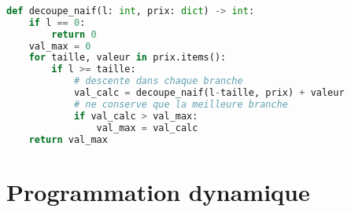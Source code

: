 \documentclass[svgnames,11pt]{beamer}
\begin{document}
\begin{frame}[fragile]
    \frametitle{}

\begin{center}
\begin{lstlisting}[language=Python , basicstyle=\ttfamily\small, xleftmargin=0.2em, xrightmargin=0em]
def decoupe_naif(l: int, prix: dict) -> int:
    if l == 0:
        return 0
    val_max = 0
    for taille, valeur in prix.items():
        if l >= taille:
            # descente dans chaque branche
            val_calc = decoupe_naif(l-taille, prix) + valeur
            # ne conserve que la meilleure branche
            if val_calc > val_max:
                val_max = val_calc
    return val_max
\end{lstlisting}
\end{center}

\end{frame}
\section{Programmation dynamique}
\end{document}
